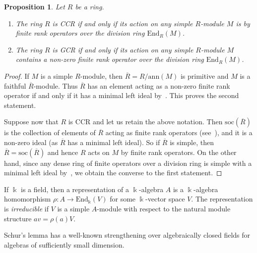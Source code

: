 \documentclass[11pt,reqno]{amsart}
\theoremstyle{plain}
\newtheorem{prop}[thm]{Proposition}
\numberwithin{equation}{section}
\begin{document}
\begin{prop}\label{p:ccrgcrnice}
Let $R$ be a ring.
\begin{enumerate}
  \item The ring $R$ is CCR if and only if its action on any simple $R$-module $M$ is by finite rank operators over the division ring $\mathrm{End}_R(M)$.
  \item The ring $R$ is GCR if and only if its action on any simple $R$-module $M$ contains a non-zero finite rank operator over the division ring $\mathrm{End}_R(M)$.
\end{enumerate}
\end{prop}
\begin{proof}
If $M$ is a simple $R$-module, then $\overline{R}=R/\mathrm{ann}(M)$ is primitive and  $M$ is a faithful $\overline{R}$-module.  Thus $\overline{R}$ has an element acting as a non-zero finite rank operator if and only if it has a minimal left ideal by~\cite[Corollary~5.33]{Bre14}. This proves the second statement.

Suppose now that $R$ is CCR and let us retain the above notation. Then $\mathrm{soc}(\overline{R})$ is the collection of elements of $\overline{R}$ acting as finite rank operators (see~\cite[Theorem~5.30]{Bre14}), and it is a non-zero ideal (as $\overline{R}$ has a minimal left ideal).  So if $\overline{R}$ is simple, then $\overline{R}=\mathrm{soc}(\overline{R})$ and hence $R$ acts on $M$ by finite rank operators. On the other hand, since any dense ring of finite operators over a division ring is simple with a minimal left ideal by~\cite[Theorem~8.1]{CohnBA3}, we obtain the converse to the first statement.
\end{proof}

If $\Bbbk$ is a field, then a representation of a $\Bbbk$-algebra $A$ is a $\Bbbk$-algebra homomorphism $\rho\colon A\to \mathrm{End}_{\Bbbk}(V)$ for some $\Bbbk$-vector space $V$.   The representation is \emph{irreducible} if $V$ is a simple $A$-module with respect to the natural module structure $av=\rho(a)V$.

Schur's lemma has a well-known strengthening over algebraically closed fields for algebras of sufficiently small dimension.
\end{document}
